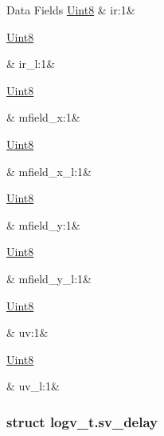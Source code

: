 \begin{DoxyFields}{Data Fields}
\hypertarget{a00021_ad74eea4899a61f9fcbc527ef988ea0ff}{\hyperlink{a00072_af84840501dec18061d18a68c162a8fa2}{Uint8}}\label{a00021_ad74eea4899a61f9fcbc527ef988ea0ff}
&
ir\+:1&
\\
\hline

\hypertarget{a00021_aca1cb7ab496af1de54107ff511aa8d75}{\hyperlink{a00072_af84840501dec18061d18a68c162a8fa2}{Uint8}}\label{a00021_aca1cb7ab496af1de54107ff511aa8d75}
&
ir\+\_\+l\+:1&
\\
\hline

\hypertarget{a00021_a46709d870ad5c3126599a53675c43291}{\hyperlink{a00072_af84840501dec18061d18a68c162a8fa2}{Uint8}}\label{a00021_a46709d870ad5c3126599a53675c43291}
&
mfield\+\_\+x\+:1&
\\
\hline

\hypertarget{a00021_ad1d9e9d372b5ce7d04e28be83c7b3823}{\hyperlink{a00072_af84840501dec18061d18a68c162a8fa2}{Uint8}}\label{a00021_ad1d9e9d372b5ce7d04e28be83c7b3823}
&
mfield\+\_\+x\+\_\+l\+:1&
\\
\hline

\hypertarget{a00021_a3f1a98f3682b6c9f001cd31bfa704220}{\hyperlink{a00072_af84840501dec18061d18a68c162a8fa2}{Uint8}}\label{a00021_a3f1a98f3682b6c9f001cd31bfa704220}
&
mfield\+\_\+y\+:1&
\\
\hline

\hypertarget{a00021_a5d5909a8f535739731de8980d0ee6521}{\hyperlink{a00072_af84840501dec18061d18a68c162a8fa2}{Uint8}}\label{a00021_a5d5909a8f535739731de8980d0ee6521}
&
mfield\+\_\+y\+\_\+l\+:1&
\\
\hline

\hypertarget{a00021_a45210da832f9626829457a65e9e7c4d0}{\hyperlink{a00072_af84840501dec18061d18a68c162a8fa2}{Uint8}}\label{a00021_a45210da832f9626829457a65e9e7c4d0}
&
uv\+:1&
\\
\hline

\hypertarget{a00021_ab360517187362bc946166e978ac32533}{\hyperlink{a00072_af84840501dec18061d18a68c162a8fa2}{Uint8}}\label{a00021_ab360517187362bc946166e978ac32533}
&
uv\+\_\+l\+:1&
\\
\hline

\end{DoxyFields}
\label{da/de4/a00594}
\hypertarget{a00021_da/de4/a00594}{}
\subsubsection{struct logv\+\_\+t.\+sv\+\_\+delay}


